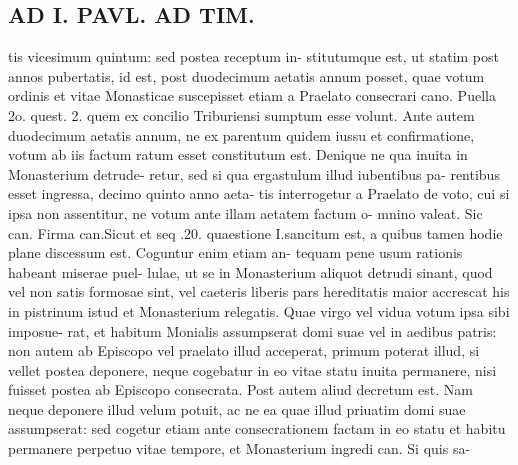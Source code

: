 \documentclass{article}
\begin{document}
\begin{pages}
\section*{AD I. PAVL. AD TIM. }
\marginpar{[ p.294 ]}tis vicesimum quintum: sed postea receptum in- stitutumque est, ut statim post annos pubertatis, id est, post duodecimum aetatis annum posset, quae votum ordinis et vitae Monasticae suscepisset etiam a Praelato consecrari cano. Puella 2o. quest. 2. quem ex concilio Triburiensi sumptum esse volunt. Ante autem duodecimum aetatis annum, ne ex parentum quidem iussu et confirmatione, votum ab iis factum ratum esset constitutum est. Denique ne qua inuita in Monasterium detrude- retur, sed si qua ergastulum illud iubentibus pa- rentibus esset ingressa, decimo quinto anno aeta- tis interrogetur a Praelato de voto, cui si ipsa non assentitur, ne votum ante illam aetatem factum o- mnino valeat. Sic can. Firma can.Sicut et seq .20. quaestione I.sancitum est, a quibus tamen hodie plane discessum est. Coguntur enim etiam an- tequam pene usum rationis habeant miserae puel- lulae, ut se in Monasterium aliquot detrudi sinant, quod vel non satis formosae sint, vel caeteris liberis pars hereditatis maior accrescat his in pistrinum istud et Monasterium relegatis. Quae virgo vel vidua votum ipsa sibi imposue- rat, et habitum Monialis assumpserat domi suae vel in aedibus patris: non autem ab Episcopo vel praelato illud acceperat, primum poterat illud, si vellet postea deponere, neque cogebatur in eo vitae statu inuita permanere, nisi fuisset postea ab Episcopo consecrata. Post autem aliud decretum est. Nam neque deponere illud velum potuit, ac ne ea quae illud priuatim domi suae assumpserat: sed cogetur etiam ante consecrationem factam in eo statu et habitu permanere perpetuo vitae tempore, et Monasterium ingredi can. Si quis sa- 

\end{pages}
\end{document}
